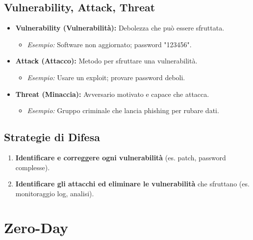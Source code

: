 \documentclass{article}
\begin{document}
\subsection{Vulnerability, Attack, Threat}
\begin{itemize}
    \item \textbf{Vulnerability (Vulnerabilità):} Debolezza che può essere sfruttata.
        \begin{itemize}
            \item \textit{Esempio:} Software non aggiornato; password "123456".
        \end{itemize}
    \item \textbf{Attack (Attacco):} Metodo per sfruttare una vulnerabilità.
        \begin{itemize}
            \item \textit{Esempio:} Usare un exploit; provare password deboli.
        \end{itemize}
    \item \textbf{Threat (Minaccia):} Avversario motivato e capace che attacca.
        \begin{itemize}
            \item \textit{Esempio:} Gruppo criminale che lancia phishing per rubare dati.
        \end{itemize}
\end{itemize}

\subsection{Strategie di Difesa}
\begin{enumerate}
    \item \textbf{Identificare e correggere ogni vulnerabilità} (es. patch, password complesse).
    \item \textbf{Identificare gli attacchi ed eliminare le vulnerabilità} che sfruttano (es. monitoraggio log, analisi).
\end{enumerate}

\section{Zero-Day}
\end{document}
